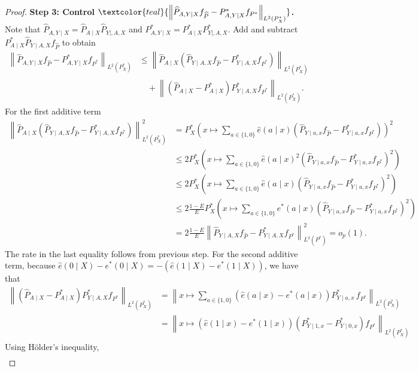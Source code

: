 \documentclass{article}
\theoremstyle{plain}
\theoremstyle{definition}
\theoremstyle{remark}
\newcommand{\of}[1]{\left(#1\right)}
\newcommand{\hP}{\widehat{P}}
\newcommand{\1}{\mathbbm{1}}
\newcommand{\norm}[1]{\left \| #1 \right \|}
\theoremstyle{plain}
\theoremstyle{definition}
\begin{document}
\begin{proof}
    \textbf{Step 3: Control $\textcolor{teal}{\norm{\hP_{A, Y \mid X}f_{\hP} - P^*_{A, Y \mid X}f_{P^*}}_{L^2(P^*_X)}}$.} Note that $\hP_{A, Y \mid X} = \hP_{A \mid X} \hP_{Y \mid, A, X}$ and $P^*_{A, Y \mid X} = P^*_{A \mid X} P^*_{Y \mid, A, X}$. Add and subtract $P^*_{A \mid X}\hP_{Y\mid A,X}f_{\hP}$ to obtain
    \begin{align*}
         \norm{\hP_{A, Y \mid X}f_{\hP} - P^*_{A, Y \mid X}f_{P^*}}_{L^2(P^*_X)} &\leq  \norm{ \hP_{A \mid X} \of{\hP_{Y \mid A, X} f_{\hP} - P^*_{Y \mid A, X} f_{P^*}}}_{L^2(P^*_X)} \\
         &\quad+ \norm{ \of{\hP_{A \mid X} - P^*_{A \mid X}}  P^*_{Y \mid A, X} f_{P^*}}_{L^2(P^*_X)}.
    \end{align*}
    For the first additive term
    \begin{align*}
        \norm{ \hP_{A \mid X} \of{\hP_{Y \mid A, X} f_{\hP} - P^*_{Y \mid A, X} f_{P^*}}}_{L^2(P^*_X)}^2 &=  P^*_X \of{ x\mapsto \sum_{a \in \{1,0\}} \hat{e}(a \mid x) \of{\hP_{Y \mid a, x} f_{\hP} - P^*_{Y \mid a, x} f_{P^*}}}^2\\
        &\leq 2 P_X^* \of{x \mapsto \sum_{a \in \{1,0\}} \hat{e}(a \mid x)^2 \of{\hP_{Y \mid a, x} f_{\hP} - P^*_{Y \mid a, x} f_{P^*}}^2}\\
        &\leq 2 P_X^* \of{x \mapsto \sum_{a \in \{1,0\}} \hat{e}(a \mid x) \of{\hP_{Y \mid a, x} f_{\hP} - P^*_{Y \mid a, x} f_{P^*}}^2}\\
        &\leq 2 \frac{1-E}{E} P_X^* \of{x \mapsto \sum_{a \in \{1,0\}} e^*(a \mid x) \of{\hP_{Y \mid a, x} f_{\hP} - P^*_{Y \mid a, x} f_{P^*}}^2}\\
        &= 2 \frac{1-E}{E} \norm{\hP_{Y \mid A, X} f_{\hP} - P^*_{Y \mid A, X} f_{P^*}}_{L^2(P^*)}^2 = o_p(1).
    \end{align*}
    The rate in the last equality follows from previous step.
    For the second additive term, because $\hat{e}(0 \mid X) - e^*(0 \mid X) = - (\hat{e}(1 \mid X) - e^*(1 \mid X))$, we have that
    \begin{align*}
        \norm{(\hP_{A \mid X} - P^*_{A \mid X}) P^*_{Y \mid A, X} f_{P^*}}_{L^2(P^*_X)} &= \norm{x \mapsto \sum_{a \in \{1,0\}} \of{\hat{e}(a \mid x) - {e}^*(a \mid x)} P^*_{Y \mid a, x} \, f_{P^*}}_{L^2(P^*_X)}\\
        &= \norm{x \mapsto \of{\hat{e}(1 \mid x) - {e}^*(1 \mid x)} \of{P^*_{Y \mid 1, x} - P^*_{Y \mid 0, x}} f_{P^*}}_{L^2(P^*_X)}
    \end{align*}
    Using Hölder's inequality,
    \begin{align*}

\end{align*}
\end{proof}
\end{document}
